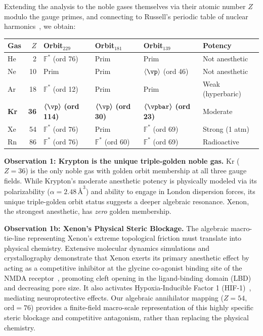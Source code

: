 \begin{remark}
\label{rem:noble_gas_orbits}
Extending the analysis to the noble gases themselves via their atomic number $Z$ modulo the gauge primes, and connecting to Russell's periodic table of nuclear harmonics~\cite{Russell1926}, we obtain:

\begin{center}
{\small
\begin{tabular}{@{}lrllll@{}}
\toprule
\textbf{Gas} & $Z$ & \textbf{Orbit$_{229}$} & \textbf{Orbit$_{181}$} & \textbf{Orbit$_{139}$} & \textbf{Potency} \\
\midrule
He &  2 & $\mathbb{F}^*$ (ord 76)  & Prim & Prim & Not anesthetic \\
Ne & 10 & Prim                      & Prim & $\langle\vp\rangle$ (ord 46) & Not anesthetic \\
Ar & 18 & $\mathbb{F}^*$ (ord 12)  & Prim & Prim & Weak (hyperbaric) \\
\textbf{Kr} & \textbf{36} & $\boldsymbol{\langle\vp\rangle}$ \textbf{(ord 114)} & $\boldsymbol{\langle\vp\rangle}$ \textbf{(ord 30)} & $\boldsymbol{\langle\vpbar\rangle}$ \textbf{(ord 23)} & Moderate \\
Xe & 54 & $\mathbb{F}^*$ (ord 76)  & Prim & $\mathbb{F}^*$ (ord 69) & Strong (1 atm) \\
Rn & 86 & $\mathbb{F}^*$ (ord 76)  & $\mathbb{F}^*$ (ord 60) & $\mathbb{F}^*$ (ord 69) & Radioactive \\
\bottomrule
\end{tabular}
}
\end{center}

\textbf{Observation 1: Krypton is the unique triple-golden noble gas.} Kr ($Z = 36$) is the only noble gas with golden orbit membership at all three gauge fields. While Krypton's moderate anesthetic potency is physically modeled via its polarizability ($\alpha = 2.48\, \text{\AA}^3$) and ability to engage in London dispersion forces, its unique triple-golden orbit status suggests a deeper algebraic resonance. Xenon, the strongest anesthetic, has \emph{zero} golden membership.

\textbf{Observation 1b: Xenon's Physical Steric Blockage.} The algebraic macro-tie-line representing Xenon's extreme topological friction must translate into physical chemistry. Extensive molecular dynamics simulations and crystallography demonstrate that Xenon exerts its primary anesthetic effect by acting as a competitive inhibitor at the glycine co-agonist binding site of the NMDA receptor~\cite{franks1998}, promoting cleft opening in the ligand-binding domain (LBD) and decreasing pore size. It also activates Hypoxia-Inducible Factor 1 (HIF-1)~\cite{maze2016}, mediating neuroprotective effects. Our algebraic annihilator mapping ($Z=54$, $\mathrm{ord}=76$) provides a finite-field macro-scale representation of this highly specific steric blockage and competitive antagonism, rather than replacing the physical chemistry.


\end{remark}
